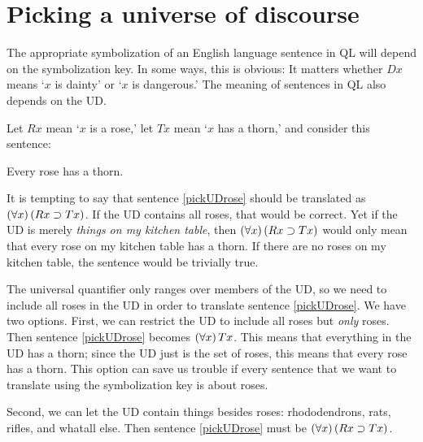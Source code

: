 \begin{table}[t]
\end{table}

\section{Picking a universe of discourse}
The appropriate symbolization of an English language sentence in QL will depend on the symbolization key. In some ways, this is obvious: It matters whether $Dx$ means `$x$ is dainty' or `$x$ is dangerous.' The meaning of sentences in QL also depends on the UD.

Let $Rx$ mean `$x$ is a rose,' let $Tx$ mean `$x$ has a thorn,' and consider this sentence:
\begin{earg}
\item[\ex{pickUDrose}] Every rose has a thorn.
\end{earg}

It is tempting to say that sentence \ref{pickUDrose} should be translated as $(\forall x) \,(Rx \supset Tx)$. If the UD contains all roses, that would be correct. Yet if the UD is merely \emph{things on my kitchen table}, then $(\forall x) \,(Rx \supset Tx)$ would only mean that every rose on my kitchen table has a thorn. If there are no roses on my kitchen table, the sentence would be trivially true.

The universal quantifier only ranges over members of the UD, so we need to include all roses in the UD in order to translate sentence \ref{pickUDrose}. We have two options. First, we can restrict the UD to include all roses but \emph{only} roses. Then sentence \ref{pickUDrose} becomes $(\forall x) \, Tx$. This means that everything in the UD has a thorn; since the UD just is the set of roses, this means that every rose has a thorn. This option can save us trouble if every sentence that we want to translate using the symbolization key is about roses.

Second, we can let the UD contain things besides roses: rhododendrons, rats, rifles, and whatall else. Then sentence \ref{pickUDrose} must be $(\forall x) \,(Rx \supset Tx)$.

